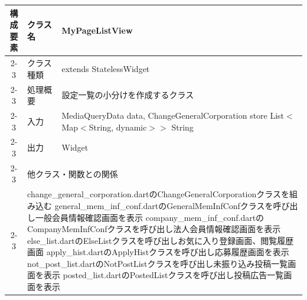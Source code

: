 \begin{longtable}{|c|l|l|}
  \multirow{7}{*}{構成要素} & クラス名                                                                                         & MyPageListView                                       \\ \cline{2-3}
                        & クラス種類                                                                                        & extends StatelessWidget                              \\ \cline{2-3}
                        & 処理概要                                                                                         & \multicolumn{1}{p{12cm}|}{設定一覧の小分けを作成するクラス}          \\ \cline{2-3}
                        & 入力                                                                                           & \multicolumn{1}{p{12cm}|}{MediaQueryData data,
    \newline ChangeGeneralCorporation store
    \newline List$<$Map$<$String, dynamic$>$$>$
  \newline String}                                                                                                                                                            \\ \cline{2-3}
                        & 出力                                                                                           & Widget                                               \\ \cline{2-3}
                        & \multicolumn{2}{l|}{他クラス・関数との関係}                                                                                                                    \\ \cline{2-3}
                        & \multicolumn{2}{p{14cm}|}{
    change\_general\_corporation.dartのChangeGeneralCorporationクラスを組み込む
    \newline general\_mem\_inf\_conf.dartのGeneralMemInfConfクラスを呼び出し一般会員情報確認画面を表示
    \newline company\_mem\_inf\_conf.dartのCompanyMemInfConfクラスを呼び出し法人会員情報確認画面を表示
    \newline else\_list.dartのElseListクラスを呼び出しお気に入り登録画面、閲覧履歴画面
    \newline apply\_hist.dartのApplyHistクラスを呼び出し応募履歴画面を表示
    \newline not\_post\_list.dartのNotPostListクラスを呼び出し未振り込み投稿一覧画面を表示
    \newline posted\_list.dartのPostedListクラスを呼び出し投稿広告一覧画面を表示
}
\end{longtable}
